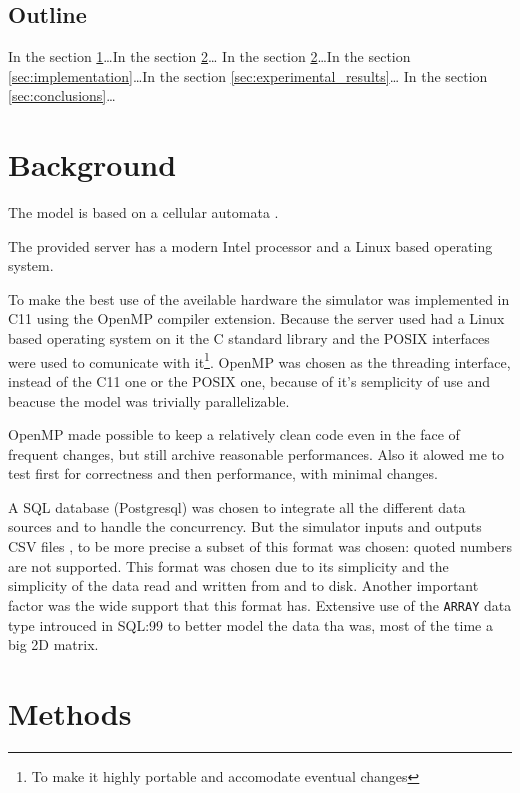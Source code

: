 \documentclass{article}
\begin{document}
\subsection{Outline}\label{sec:outline}

In the section \ref{sec:background}\dots In the section \ref{sec:methods}\dots
In the section \ref{sec:methods}\dots In the section
\ref{sec:implementation}\dots In the section \ref{sec:experimental_results}\dots
In the section \ref{sec:conclusions}\dots

\section{Background}\label{sec:background}

The model is based on a cellular automata \cite{gol}.

The provided server has a modern Intel processor and a Linux based operating
system.

To make the best use of the aveilable hardware the simulator was implemented in
C11 using the OpenMP compiler extension.  Because the server used had a Linux
based operating system on it the C standard library and the POSIX interfaces
were used to comunicate with it\footnote{To make it highly portable and
accomodate eventual changes}. OpenMP was chosen as the threading interface,
instead of the C11 one or the POSIX one, because of it's semplicity of use and
beacuse the model was trivially parallelizable.

OpenMP made possible to keep a relatively clean code even in the face of
frequent changes, but still archive reasonable performances. Also it alowed me
to test first for correctness and then performance, with minimal changes.

A SQL database (Postgresql) was chosen to integrate all the different data
sources and to handle the concurrency. But the simulator inputs and outputs CSV
files \cite{csv}, to be more precise a subset of this format was chosen: quoted
numbers are not supported. This format was chosen due to its simplicity and the
simplicity of the data read and written from and to disk. Another important
factor was the wide support that this format has. Extensive use of the
\texttt{ARRAY} data type introuced in SQL:99 to better model the data tha was,
most of the time a big 2D matrix.

\section{Methods}\label{sec:methods}
\end{document}
